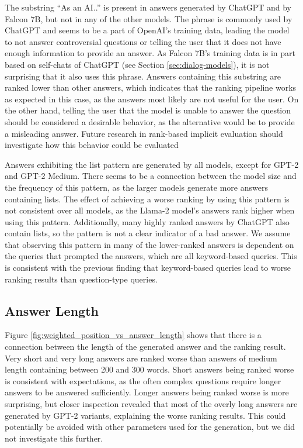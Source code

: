 The substring ``As an AI..'' is present in answers generated by ChatGPT and by Falcon 7B, but not in any of the other models.
The phrase is commonly used by ChatGPT and seems to be a part of OpenAI's training data, leading the model to not answer controversial questions or telling the user that it does not have enough information to provide an answer.
As Falcon 7B's training data is in part based on self-chats of ChatGPT (see Section \ref{sec:dialog-models}), it is not surprising that it also uses this phrase.
Answers containing this substring are ranked lower than other answers, which indicates that the ranking pipeline works as expected in this case, as the answers most likely are not useful for the user.
On the other hand, telling the user that the model is unable to answer the question should be considered a desirable behavior, as the alternative would be to provide a misleading answer.
Future research in rank-based implicit evaluation should investigate how this behavior could be evaluated

Answers exhibiting the list pattern are generated by all models, except for GPT-2 and GPT-2 Medium.
There seems to be a connection between the model size and the frequency of this pattern, as the larger models generate more answers containing lists.
The effect of achieving a worse ranking by using this pattern is not consistent over all models, as the Llama-2 model's answers rank higher when using this pattern.
Additionally, many highly ranked answers by ChatGPT also contain lists, so the pattern is not a clear indicator of a bad answer.
We assume that observing this pattern in many of the lower-ranked answers is dependent on the queries that prompted the answers, which are all keyword-based queries.
This is consistent with the previous finding that keyword-based queries lead to worse ranking results than question-type queries.

\subsection{Answer Length}
Figure \ref{fig:weighted_position_vs_answer_length} shows that there is a connection between the length of the generated answer and the ranking result.
Very short and very long answers are ranked worse than answers of medium length containing between 200 and 300 words.
Short answers being ranked worse is consistent with expectations, as the often complex questions require longer answers to be answered sufficiently.
Longer answers being ranked worse is more surprising, but closer inspection revealed that most of the overly long answers are generated by GPT-2 variants, explaining the worse ranking results.
This could potentially be avoided with other parameters used for the generation, but we did not investigate this further.

